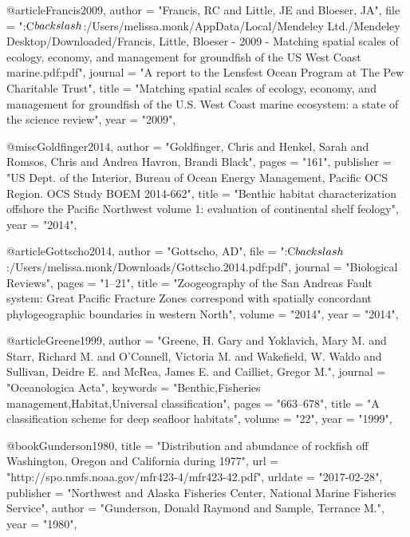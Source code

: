@article{Francis2009,
    author = "{Francis, RC and Little, JE and Bloeser, JA}",
    file = "{:C$\\backslash$:/Users/melissa.monk/AppData/Local/Mendeley Ltd./Mendeley Desktop/Downloaded/Francis, Little, Bloeser - 2009 - Matching spatial scales of ecology, economy, and management for groundfish of the US West Coast marine.pdf:pdf}",
    journal = "{A report to the Lensfest Ocean Program at The Pew Charitable Trust}",
    title = "{{Matching spatial scales of ecology, economy, and management for groundfish of the U.S. West Coast marine ecosystem: a state of the science review}}",
    year = "{2009}",
}

@misc{Goldfinger2014,
    author = "{Goldfinger, Chris and Henkel, Sarah and Romsos, Chris and {Andrea Havron}, Brandi Black}",
    pages = "{161}",
    publisher = "{US Dept. of the Interior, Bureau of Ocean Energy Management, Pacific OCS Region. OCS Study BOEM 2014-662}",
    title = "{{Benthic habitat characterization offshore the Pacific Northwest volume 1: evaluation of continental shelf feology}}",
    year = "{2014}",
}

@article{Gottscho2014,
    author = "{Gottscho, AD}",
    file = "{:C$\\backslash$:/Users/melissa.monk/Downloads/Gottscho.2014.pdf:pdf}",
    journal = "{Biological Reviews}",
    pages = "{1--21}",
    title = "{{Zoogeography of the San Andreas Fault system: Great Pacific Fracture Zones correspond with spatially concordant phylogeographic boundaries in western North}}",
    volume = "{2014}",
    year = "{2014}",
}

@article{Greene1999,
    author = "{Greene, H. Gary and Yoklavich, Mary M. and Starr, Richard M. and O'Connell, Victoria M. and Wakefield, W. Waldo and Sullivan, Deidre E. and McRea, James E. and Cailliet, Gregor M.}",
    journal = "{Oceanologica Acta}",
    keywords = "{Benthic,Fisheries management,Habitat,Universal classification}",
    pages = "{663--678}",
    title = "{{A classification scheme for deep seafloor habitats}}",
    volume = "{22}",
    year = "{1999}",
}

@book{Gunderson1980,
    title = "{Distribution and abundance of rockfish off {Washington}, {Oregon} and {California} during 1977}",
    url = "{http://spo.nmfs.noaa.gov/mfr423-4/mfr423-42.pdf}",
    urldate = "{2017-02-28}",
    publisher = "{Northwest and Alaska Fisheries Center, National Marine Fisheries Service}",
    author = "{Gunderson, Donald Raymond and Sample, Terrance M.}",
    year = "{1980}",
}


